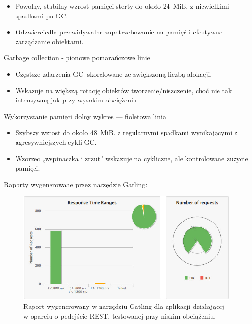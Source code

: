\documentclass[runningheads,12pt]{llncs}
\begin{document}
\begin{itemize}
  \item Powolny, stabilny wzrost pamięci sterty do około 24~MiB, z niewielkimi spadkami po GC.
  \item Odzwierciedla przewidywalne zapotrzebowanie na pamięć i efektywne zarządzanie obiektami.
\end{itemize}

Garbage collection - pionowe pomarańczowe linie

\begin{itemize}
  \item Częstsze zdarzenia GC, skorelowane ze zwiększoną liczbą alokacji.
  \item Wskazuje na większą rotację obiektów tworzenie/niszczenie, choć nie tak intensywną jak przy wysokim obciążeniu.
\end{itemize}

Wykorzystanie pamięci dolny wykres — fioletowa linia

\begin{itemize}
  \item Szybszy wzrost do około 48~MiB, z regularnymi spadkami wynikającymi z agresywniejszych cykli GC.
  \item Wzorzec „wspinaczka i zrzut” wskazuje na cykliczne, ale kontrolowane zużycie pamięci.
\end{itemize}

\newpage

Raporty wygenerowane przez narzędzie Gatling:


\begin{figure}
    \includegraphics[width=\linewidth]{images/rest-gatling-low-graph.jpg}
    \caption{Raport wygenerowany w narzędziu Gatling dla aplikacji działającej w oparciu o podejście REST, testowanej przy niskim obciążeniu.} \label{fig1}
\end{figure}
\end{document}

